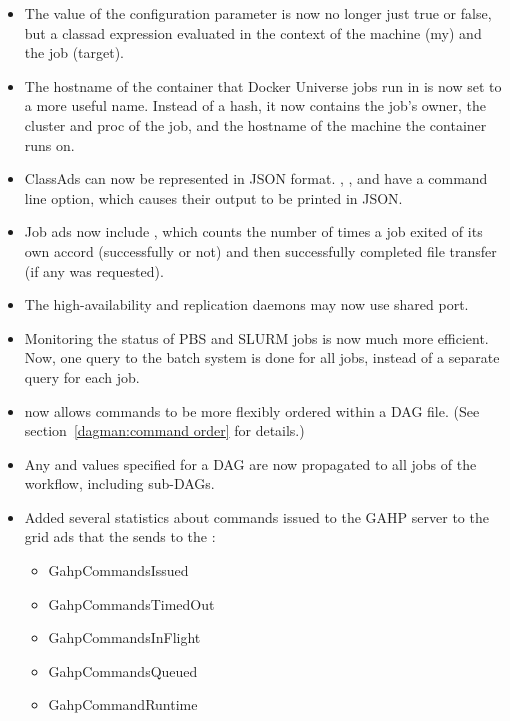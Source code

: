 \begin{itemize}

\item The value of the configuration parameter 
 is now no longer just
true or false, but a classad expression evaluated in the context
of the machine (my) and the job (target).

\item The hostname of the container that Docker Universe jobs
run in is now set to a more useful name.  Instead of a hash, it
now contains the job's owner, the cluster and proc of the job,
and the hostname of the machine the container runs on.

\item ClassAds can now be represented in JSON format.
, , and  have a 
command line option, which causes their output to be printed in JSON.

\item Job ads now include , which counts the
number of times a job exited of its own accord (successfully or not) and
then successfully completed file transfer (if any was requested).

\item The high-availability and replication daemons may now use shared port.

\item Monitoring the status of PBS and SLURM jobs is now much more efficient.
Now, one query to the batch system is done for all jobs, instead of a
separate query for each job.

\item {} now allows commands to be more flexibly ordered
within a DAG file.  (See section~\ref{dagman:command order} for details.)

\item Any  and
 values specified for a
DAG are now propagated to all jobs of the workflow, including sub-DAGs.

\item Added several statistics about commands issued to the GAHP server
to the grid ads that the  sends to the :
  \begin{itemize}
  \item GahpCommandsIssued
  \item GahpCommandsTimedOut
  \item GahpCommandsInFlight
  \item GahpCommandsQueued
  \item GahpCommandRuntime
  \end{itemize}


\end{itemize}
